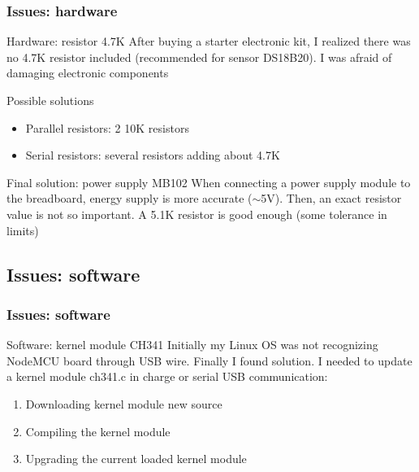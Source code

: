 \documentclass[
    aspectratio=169,                   %
]{beamer}
\begin{document}
    \begin{frame}
        \frametitle{Issues: hardware}

        \begin{block}{Hardware: resistor 4.7K}
            After buying a starter electronic kit, I realized there was no 4.7K resistor included (recommended\cite{resistor} for sensor DS18B20). I was afraid of damaging electronic components
        \end{block}

        \begin{block}{Possible solutions}
            \begin{itemize}
                \item \alert{Parallel resistors}: 2 10K resistors
                \item \alert{Serial resistors}: several resistors adding about 4.7K
            \end{itemize}
        \end{block}

        \begin{block}{Final solution: power supply MB102}
            When connecting a power supply module to the breadboard, energy supply is more accurate ($\sim$5V). Then, an exact resistor value is not so important. A 5.1K resistor is good enough (some tolerance in limits)
        \end{block}

    \end{frame}

\subsection{Issues: software}

    \begin{frame}
        \frametitle{Issues: software}

        \begin{block}{Software: kernel module CH341}
            Initially my Linux OS was not recognizing NodeMCU board through USB wire. Finally I found solution.\cite{ch341} I needed to update a kernel module \alert{ch341.c} in charge or serial USB communication:
            \begin{enumerate}
                \item Downloading kernel module new source
                \item Compiling the kernel module
                \item Upgrading the current loaded kernel module
            \end{enumerate}
        \end{block}


    \end{frame}
\end{document}
